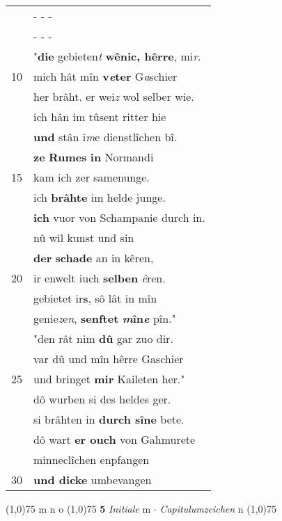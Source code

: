 \documentclass[8pt,a4paper,notitlepage]{article}
\begin{document}
\begin{table}[ht]
\begin{minipage}[t]{0.5\linewidth}
\begin{tabular}{rl}
 & \multicolumn{1}{l}{ - - - }\\ 
 & \multicolumn{1}{l}{ - - - }\\ 
 & "\textbf{die} gebieten\textit{t} \textbf{wênic, hêrre}, mi\textit{r}.\\ 
10 & mich hât mîn \textbf{v\textit{e}ter} G\textit{a}schier\\ 
 & her brâht. er wei\textit{z} wol selber wie.\\ 
 & ich hân im tûsent ritter hie\\ 
 & \textbf{und} stân i\textit{m}e dienstlîchen bî.\\ 
 & \textbf{ze} \textbf{Rumes} \textbf{in} Normandi\\ 
15 & kam ich zer samenunge.\\ 
 & ich \textbf{brâhte} im helde junge.\\ 
 & \textbf{ich} vuor von Schampanie durch in.\\ 
 & nû wil kunst und sin\\ 
 & \textbf{der} \textbf{schade} an in kêren,\\ 
20 & ir enwelt iuch \textbf{selben} \textit{ê}ren.\\ 
 & gebietet ir\textbf{s}, sô lât in mîn\\ 
 & genie\textit{z}e\textit{n}, \textbf{senftet} \textbf{\textit{m}în\textit{e}} pîn."\\ 
 & "den rât nim \textbf{dû} gar zuo dir.\\ 
 & var dû und mîn hêrre Gaschier\\ 
25 & und bringet \textbf{mir} Kaileten her."\\ 
 & dô wurben si des heldes ger.\\ 
 & si brâhten in \textbf{durch sîne} bete.\\ 
 & dô wart \textbf{er ouch} von Gahmurete\\ 
 & minneclîchen enpfangen\\ 
30 & \textbf{und dicke} umbevangen\\ 
\end{tabular}
\scriptsize
\line(1,0){75} \newline
m n o \newline
\line(1,0){75} \newline
\textbf{5} \textit{Initiale} m   $\cdot$ \textit{Capitulumzeichen} n  \newline
\line(1,0){75} \newline

\end{minipage}
\end{table}
\end{document}
